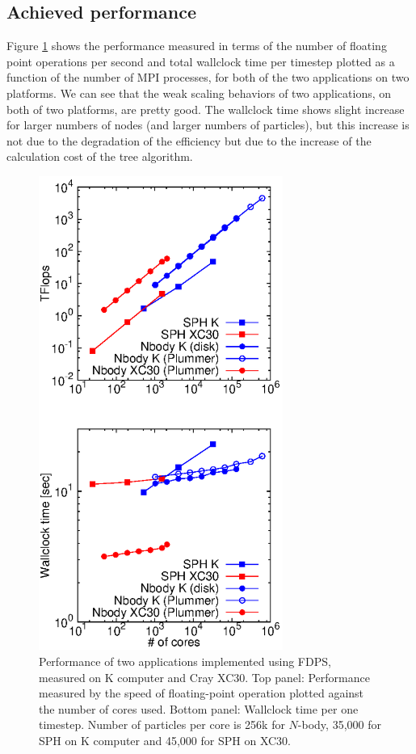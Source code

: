 \documentclass[dvipdfmx]{acm_proc_article-sp}
\begin{document}
\subsection{Achieved performance}
\label{sect:achievedperformance}

Figure \ref{fig:performance} shows the performance measured in terms
of the number of floating point operations per
second and total wallclock time per timestep plotted as a function of
the number of MPI processes, for both of the two applications on two
platforms. We can see that the weak scaling behaviors of two
applications, on both of two platforms, are pretty good. The wallclock
time shows slight increase for larger numbers of nodes (and larger
numbers of particles), but this increase is not due to the degradation
of the efficiency but due to the increase of the calculation cost of
the tree algorithm.

\begin{figure}
  \begin{center}
    \includegraphics[width=8cm]{Flops_and_Wallclock.eps}
  \end{center}
  \caption{Performance of two applications implemented using FDPS,
    measured on K computer and Cray XC30. Top panel: Performance
    measured by the speed of floating-point operation plotted against
    the number of cores used. Bottom panel: Wallclock time per one
    timestep. Number of particles per core is 256k for $N$-body, 
    35,000 for SPH on K computer and  45,000 for SPH  on XC30.}
  \label{fig:performance}
\end{figure}
\end{document}
